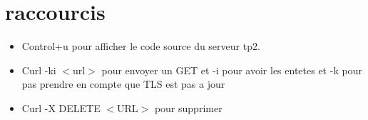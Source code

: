 \documentclass[12pt]{article}
\theoremstyle{plain}
\theoremstyle{definition}
\theoremstyle{remark}
\begin{document}
\section{raccourcis}
\begin{itemize}
    \item Control+u pour afficher le code source du serveur tp2. 
    \item Curl -ki $<$url$>$ pour envoyer un GET et -i pour avoir les entetes et -k pour pas prendre en compte que TLS est pas a jour
    \item Curl -X DELETE $<$URL$>$ pour supprimer 
\end{itemize}
\end{document}
